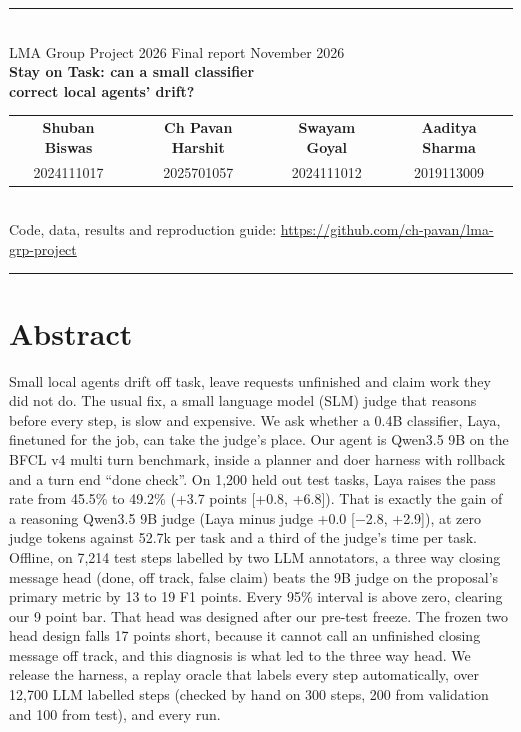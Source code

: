 \documentclass[10pt,a4paper]{article}
\newcommand{\m}{$-$}
\begin{document}
\thispagestyle{plain}
\begin{center}
{\color{rule}\rule{\linewidth}{1.2pt}}\\[4pt]
{\small\sffamily\color{sub}LMA Group Project 2026 \enspace\textperiodcentered\enspace Final report \enspace\textperiodcentered\enspace November 2026}\\[5pt]
{\sffamily\LARGE\bfseries\color{head} Stay on Task: can a small classifier\\[1pt] correct local agents' drift?}\\[7pt]
\begin{tabular}{cccc}
\textbf{Shuban Biswas} & \textbf{Ch Pavan Harshit} & \textbf{Swayam Goyal} & \textbf{Aaditya Sharma}\\
{\footnotesize 2024111017} & {\footnotesize 2025701057} & {\footnotesize 2024111012} & {\footnotesize 2019113009}
\end{tabular}\\[4pt]
{\footnotesize Code, data, results and reproduction guide: \url{https://github.com/ch-pavan/lma-grp-project}}\\[2pt]
{\color{rule}\rule{\linewidth}{0.5pt}}
\end{center}

\section*{Abstract}
Small local agents drift off task, leave requests unfinished and claim work they did not do. The usual fix, a small language model (SLM) judge that reasons before every step, is slow and expensive. We ask whether a 0.4B classifier, Laya, finetuned for the job, can take the judge's place. Our agent is Qwen3.5 9B on the BFCL v4 multi turn benchmark, inside a planner and doer harness with rollback and a turn end ``done check''. On 1,200 held out test tasks, Laya raises the pass rate from 45.5\% to 49.2\% (+3.7 points [+0.8, +6.8]). That is exactly the gain of a reasoning Qwen3.5 9B judge (Laya minus judge +0.0 [\m2.8, +2.9]), at zero judge tokens against 52.7k per task and a third of the judge's time per task. Offline, on 7,214 test steps labelled by two LLM annotators, a three way closing message head (done, off track, false claim) beats the 9B judge on the proposal's primary metric by 13 to 19 F1 points. Every 95\% interval is above zero, clearing our 9 point bar. That head was designed after our pre-test freeze. The frozen two head design falls 17 points short, because it cannot call an unfinished closing message off track, and this diagnosis is what led to the three way head. We release the harness, a replay oracle that labels every step automatically, over 12,700 LLM labelled steps (checked by hand on 300 steps, 200 from validation and 100 from test), and every run.
\end{document}
